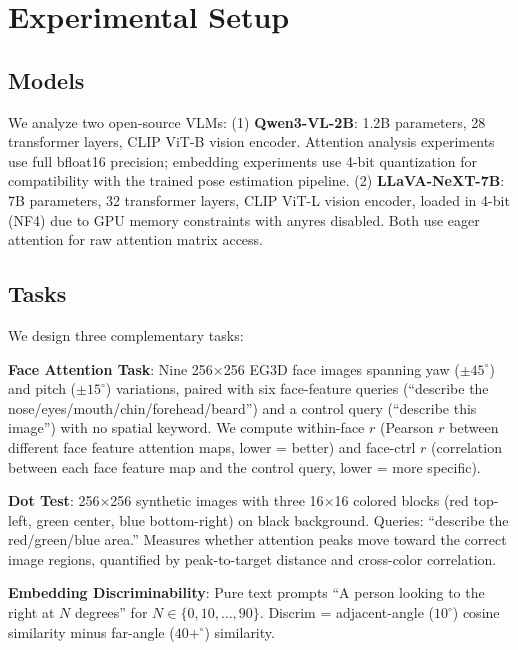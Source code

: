 \documentclass[10pt,twocolumn,letterpaper]{article}
\begin{document}
\section{Experimental Setup}
\label{sec:setup}

\subsection{Models}

We analyze two open-source VLMs: (1) \textbf{Qwen3-VL-2B}: 1.2B parameters, 28 transformer layers, CLIP ViT-B vision encoder. Attention analysis experiments use full bfloat16 precision; embedding experiments use 4-bit quantization for compatibility with the trained pose estimation pipeline. (2) \textbf{LLaVA-NeXT-7B}: 7B parameters, 32 transformer layers, CLIP ViT-L vision encoder, loaded in 4-bit (NF4) due to GPU memory constraints with anyres disabled. Both use eager attention for raw attention matrix access.

\subsection{Tasks}

We design three complementary tasks:

\textbf{Face Attention Task}: Nine 256$\times$256 EG3D face images spanning yaw ($\pm45^\circ$) and pitch ($\pm15^\circ$) variations, paired with six face-feature queries (``describe the nose/eyes/mouth/chin/forehead/beard'') and a control query (``describe this image'') with no spatial keyword. We compute within-face $r$ (Pearson $r$ between different face feature attention maps, lower = better) and face-ctrl $r$ (correlation between each face feature map and the control query, lower = more specific).

\textbf{Dot Test}: 256$\times$256 synthetic images with three 16$\times$16 colored blocks (red top-left, green center, blue bottom-right) on black background. Queries: ``describe the red/green/blue area.'' Measures whether attention peaks move toward the correct image regions, quantified by peak-to-target distance and cross-color correlation.

\textbf{Embedding Discriminability}: Pure text prompts ``A person looking to the right at $N$ degrees'' for $N \in \{0, 10, \ldots, 90\}$. Discrim = adjacent-angle ($10^\circ$) cosine similarity minus far-angle ($40+^\circ$) similarity.
\end{document}
